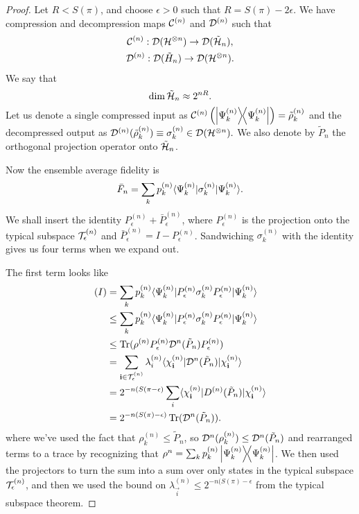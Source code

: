 \begin{proof}
    Let $R<S(\pi)$, and choose $\epsilon >0$ such that $R=S(\pi)-2\epsilon$. We have compression and decompression maps $\mathcal{C}^{(n)}$ and $\mathcal{D}^{(n)}$
    such that
    \begin{gather}
        \mathcal{C}^{(n)}: \mathcal{D}(\mathcal H^{\otimes n})\to \mathcal{D}(\tilde {\mathcal H}_n),\\
        \mathcal{D}^{(n)}: \mathcal{D}(\tilde H_n) \to \mathcal{D}(\mathcal H^{\otimes n}).
    \end{gather}
    We say that
    \begin{equation}
        \dim \tilde {\mathcal H}_n \approx 2^{nR}.
    \end{equation}
    Let us denote a single compressed input as $\mathcal{C}^{(n)}\left(\left\lvert{\Psi_k^{(n)}}\middle\rangle\!\middle\langle{\Psi_k^{(n)}}\right\rvert\right)=\tilde \rho_k^{(n)}$ and the decompressed output as $\mathcal{D}^{(n)}(\tilde \rho_k^{(n)}) \equiv \sigma_k^{(n)} \in \mathcal{D}(\mathcal H^{\otimes n}).$
    We also denote by $\tilde P_n$ the orthogonal projection operator onto $\tilde {\mathcal H}_n$.
    
    Now the ensemble average fidelity is
    \begin{equation}
        \bar F_n =\sum_k p_k^{(n)} \langle\Psi_k^{(n)}\rvert\sigma_k^{(n)} \lvert\Psi_k^{(n)}\rangle.
    \end{equation}
    We shall insert the identity $P_\epsilon^{(n)}+\bar P_\epsilon^{(n)}$, where $P_\epsilon^{(n)}$ is the projection onto the typical subspace $\mathcal T_\epsilon^{(n)}$ and $\bar P_\epsilon^{(n)}=I-P_\epsilon^{(n)}$. Sandwiching $\sigma_k^{(n)}$ with the identity gives us four terms when we expand out.
    
    The first term looks like
    \begin{align*}
        (I) &= \sum_k p_k^{(n)} \langle\Psi_k^{(n)}\rvert P_\epsilon^{(n)} \sigma_k^{(n)} P_\epsilon^{(n)} \lvert\Psi_k^{(n)}\rangle\\
            &\leq \sum_k p_k^{(n)} \langle\Psi_k^{(n)}\rvert P_\epsilon^{(n)} \sigma_k^{(n)} P_\epsilon^{(n)} \lvert\Psi_k^{(n)}\rangle\\
            &\leq\operatorname{Tr}(\rho^{(n)} P_\epsilon^{(n)} \mathcal{D}^{n}(\tilde P_n) P_\epsilon^{(n)})\\
            &= \sum_{\boldsymbol{\mathbf{i}} \in \mathcal T_{\epsilon}^{(n)}} \lambda_i^{(n)} \langle\chi_{\boldsymbol{\mathbf{i}}}^{(n)}\rvert \mathcal{D}^{n}(\tilde P_n) \lvert\chi_{\boldsymbol{\mathbf{i}}}^{(n)}\rangle\\
            &= 2^{-n(S(\pi-\epsilon)} \sum_i \langle\chi_{\boldsymbol{\mathbf{i}}}^{(n)}\rvert D^{(n)}(\tilde P_n)\lvert\chi_{\boldsymbol{\mathbf{i}}}^{(n)}\rangle\\
            &= 2^{-n(S(\pi)-\epsilon)} \operatorname{Tr}(\mathcal{D}^n(\tilde P_n)).
    \end{align*}
    where we've used the fact that $\rho_k^{(n)} \leq \tilde P_n$, so $\mathcal{D}^n(\rho_k^{(n)})\leq \mathcal{D}^n(\tilde P_n)$ and rearranged terms to a trace by recognizing that $\rho^n=\sum_k p_k^{(n)} \left\lvert{\Psi_k^{(n)}}\middle\rangle\!\middle\langle{\Psi_k^{(n)}}\right\rvert$. We then used the projectors to turn the sum into a sum over only states in the typical subspace $\mathcal T_\epsilon^{(n)}$, and then we used the bound on $\lambda_{\vec i}^{(n)}\leq 2^{-n(S(\pi)-\epsilon}$ from the typical subspace theorem.
    

\end{proof}
